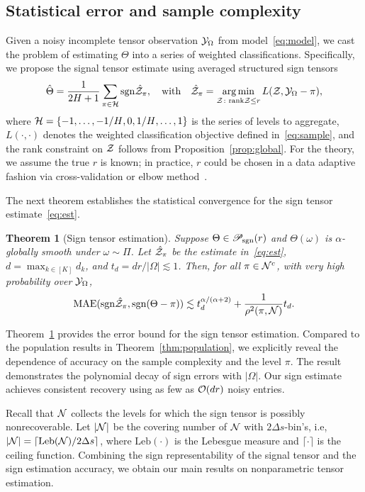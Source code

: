\documentclass{article}
\theoremstyle{plain}
\newtheorem{thm}{Theorem}
\theoremstyle{definition}
\def\sign{\textup{sgn}}
\def\caliP{\mathscr{P}_{\textup{sgn}}}
\begin{document}
\subsection{Statistical error and sample complexity}\label{sec:error}
Given a noisy incomplete tensor observation $\mathcal{Y}_\Omega$ from model~\eqref{eq:model}, we cast the problem of estimating $\Theta$ into a series of weighted classifications. Specifically, we propose the signal tensor estimate using averaged structured sign tensors
\begin{equation}\label{eq:est}
\hat \Theta = {1\over 2H+1}\sum_{\pi \in \tH}\sign{\hat \tZ_\pi}, \quad \text{with}\quad \hat \tZ_\pi = \argmin_{\tZ\colon \text{rank}\tZ\leq r} L(\tZ, \tY_\Omega-\pi),
\end{equation}
where $\mathcal{H}=\{-1,\ldots,-{1/ H}, 0, {1/H},\ldots,1\}$ is the series of levels to aggregate, $L(\cdot,\cdot)$ denotes the weighted classification objective defined in~\eqref{eq:sample}, and the rank constraint on $\mathcal{Z}$ follows from Proposition~\ref{prop:global}. For the theory, we assume the true $r$ is known; in practice, $r$ could be chosen in a data adaptive fashion via cross-validation or elbow method~\citep{hastie2009elements}. 

The next theorem establishes the statistical convergence for the sign tensor estimate~\eqref{eq:est}.

\begin{thm}[Sign tensor estimation]\label{thm:classification} Suppose $\Theta\in\caliP(r)$ and $\Theta(\omega)$ is $\alpha$-globally smooth under $\omega\sim \Pi$. Let $\hat {\mathcal{Z}}_\pi$ be the estimate in~\eqref{eq:est}, $d=\max_{k\in[K]}d_k$, and $t_d =dr/|\Omega|\lesssim 1$. Then, for all $\pi\in\mathcal{N}^c$, with very high probability over $\mathcal{Y}_\Omega$, 
\begin{align}\label{eq:bound}
\textup{MAE}(\sign \hat \tZ_\pi, \sign(\Theta-\pi)) \lesssim t_d^{\alpha/( \alpha+2)}+{1 \over \rho^2(\pi, \tN)}t_d.
\end{align}
\end{thm}
Theorem~\ref{thm:classification} provides the error bound for the sign tensor estimation. Compared to the population results in Theorem~\ref{thm:population}, we explicitly reveal the dependence of accuracy on the sample complexity and the level $\pi$. The result demonstrates the polynomial decay of sign errors with $|\Omega|$.  Our sign estimate achieves consistent recovery using as few as $\mathcal{O}(dr)$ noisy entries. 

Recall that $\mathcal{N}$ collects the levels for which the sign tensor is possibly nonrecoverable. Let $|\mathcal{N}|$ be the covering number of $\mathcal{N}$ with $2\Delta s$-bin's, i.e, $|\mathcal{N}| = \lceil \text{Leb}(\mathcal{N})/2\Delta s \rceil$, where $\text{Leb}(\cdot)$ is the Lebesgue measure and $\lceil \cdot \rceil$ is the ceiling function. Combining the sign representability of the signal tensor and the sign estimation accuracy, we obtain our main results on nonparametric tensor estimation. 
\end{document}
